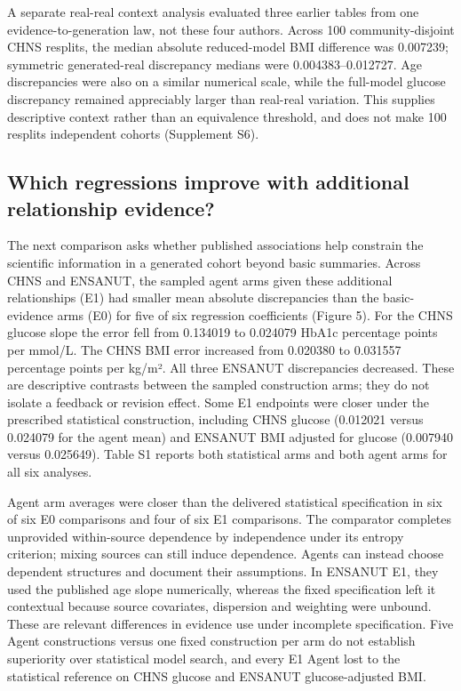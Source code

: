 \documentclass[11pt,letterpaper]{article}
\begin{document}
A separate real-real context analysis evaluated three earlier tables from one evidence-to-generation law, not these four authors. Across 100 community-disjoint CHNS resplits, the median absolute reduced-model BMI difference was 0.007239; symmetric generated-real discrepancy medians were 0.004383–\allowbreak{}0.012727. Age discrepancies were also on a similar numerical scale, while the full-model glucose discrepancy remained appreciably larger than real-real variation. This supplies descriptive context rather than an equivalence threshold, and does not make 100 resplits independent cohorts (Supplement S6).


\subsection{Which regressions improve with additional relationship evidence?}

The next comparison asks whether published associations help constrain the scientific information in a generated cohort beyond basic summaries. Across CHNS and ENSANUT, the sampled agent arms given these additional relationships (E1) had smaller mean absolute discrepancies than the basic-evidence arms (E0) for five of six regression coefficients (Figure 5). For the CHNS glucose slope the error fell from 0.134019 to 0.024079 HbA1c percentage points per mmol/\allowbreak{}L. The CHNS BMI error increased from 0.020380 to 0.031557 percentage points per kg/\allowbreak{}m². All three ENSANUT discrepancies decreased. These are descriptive contrasts between the sampled construction arms; they do not isolate a feedback or revision effect. Some E1 endpoints were closer under the prescribed statistical construction, including CHNS glucose (0.012021 versus 0.024079 for the agent mean) and ENSANUT BMI adjusted for glucose (0.007940 versus 0.025649). Table S1 reports both statistical arms and both agent arms for all six analyses.


Agent arm averages were closer than the delivered statistical specification in six of six E0 comparisons and four of six E1 comparisons. The comparator completes unprovided within-source dependence by independence under its entropy criterion; mixing sources can still induce dependence. Agents can instead choose dependent structures and document their assumptions. In ENSANUT E1, they used the published age slope numerically, whereas the fixed specification left it contextual because source covariates, dispersion and weighting were unbound. These are relevant differences in evidence use under incomplete specification. Five Agent constructions versus one fixed construction per arm do not establish superiority over statistical model search, and every E1 Agent lost to the statistical reference on CHNS glucose and ENSANUT glucose-adjusted BMI.
\end{document}
